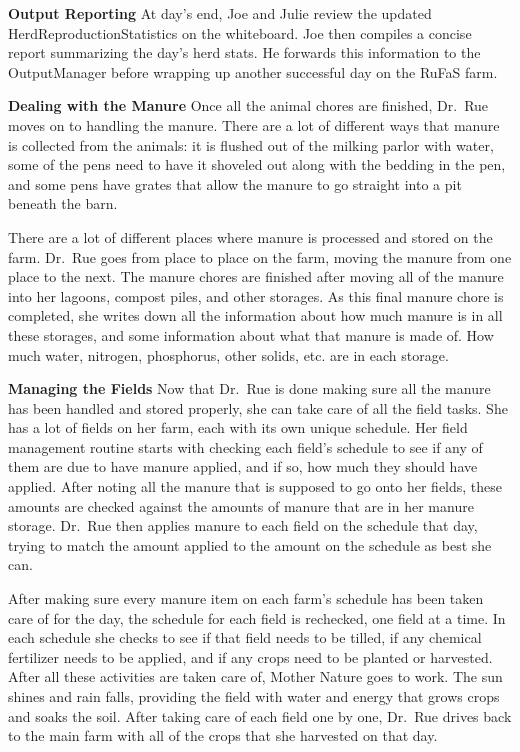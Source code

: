 \documentclass[
  letterpaper,
  oneside,
  openany]{scrbook}
\begin{document}
\textbf{Output Reporting} At day's end, Joe and Julie review the updated
HerdReproductionStatistics on the whiteboard. Joe then compiles a
concise report summarizing the day's herd stats. He forwards this
information to the OutputManager before wrapping up another successful
day on the RuFaS farm.

\textbf{Dealing with the Manure} Once all the animal chores are
finished, Dr.~Rue moves on to handling the manure. There are a lot of
different ways that manure is collected from the animals: it is flushed
out of the milking parlor with water, some of the pens need to have it
shoveled out along with the bedding in the pen, and some pens have
grates that allow the manure to go straight into a pit beneath the barn.

There are a lot of different places where manure is processed and stored
on the farm. Dr.~Rue goes from place to place on the farm, moving the
manure from one place to the next. The manure chores are finished after
moving all of the manure into her lagoons, compost piles, and other
storages. As this final manure chore is completed, she writes down all
the information about how much manure is in all these storages, and some
information about what that manure is made of. How much water, nitrogen,
phosphorus, other solids, etc. are in each storage.

\textbf{Managing the Fields} Now that Dr.~Rue is done making sure all
the manure has been handled and stored properly, she can take care of
all the field tasks. She has a lot of fields on her farm, each with its
own unique schedule. Her field management routine starts with checking
each field's schedule to see if any of them are due to have manure
applied, and if so, how much they should have applied. After noting all
the manure that is supposed to go onto her fields, these amounts are
checked against the amounts of manure that are in her manure storage.
Dr.~Rue then applies manure to each field on the schedule that day,
trying to match the amount applied to the amount on the schedule as best
she can.

After making sure every manure item on each farm's schedule has been
taken care of for the day, the schedule for each field is rechecked, one
field at a time. In each schedule she checks to see if that field needs
to be tilled, if any chemical fertilizer needs to be applied, and if any
crops need to be planted or harvested. After all these activities are
taken care of, Mother Nature goes to work. The sun shines and rain
falls, providing the field with water and energy that grows crops and
soaks the soil. After taking care of each field one by one, Dr.~Rue
drives back to the main farm with all of the crops that she harvested on
that day.
\end{document}
